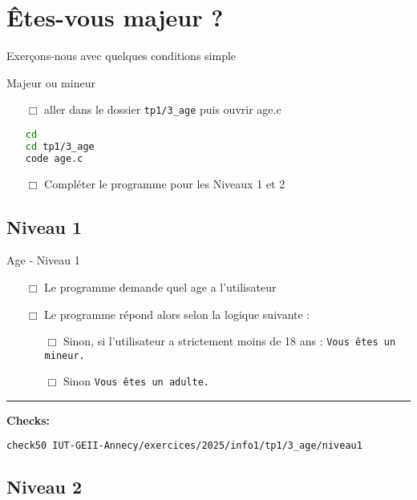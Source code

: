
\section{Êtes-vous majeur ?}
Exerçons-nous avec quelques conditions simple

\begin{UPSTIManipulation}{Majeur ou mineur}
	\begin{itemize}
		\item[$\Box$] aller dans le dossier \texttt{tp1/3\_age} puis ouvrir age.c
		      \begin{lstlisting}[language=bash,style=console]
cd
cd tp1/3_age
code age.c
\end{lstlisting}
		\item[$\Box$] Compléter le programme pour les Niveaux 1 et 2
	\end{itemize}
\end{UPSTIManipulation}

\subsection{Niveau 1}

\begin{UPSTIcahierDesCharges}{Age - Niveau 1}
	\begin{itemize}
		\item[$\Box$] Le programme demande quel age a l'utilisateur
		\item[$\Box$] Le programme répond alors selon la logique suivante :
		      \begin{itemize}
			      \item[$\Box$] Sinon, si l'utilisateur a strictement moins de 18 ans : \texttt{Vous êtes un mineur.}
			      \item[$\Box$] Sinon \texttt{Vous êtes un adulte.}
		      \end{itemize}
	\end{itemize}
	\hrule
	\textbf{Checks:}
	\begin{lstlisting}[language=bash,style=console]
check50 IUT-GEII-Annecy/exercices/2025/info1/tp1/3_age/niveau1
\end{lstlisting}
\end{UPSTIcahierDesCharges}

\subsection{Niveau 2}

